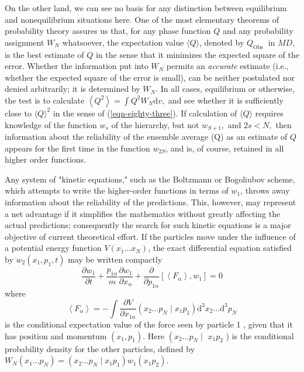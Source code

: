 \documentclass[]{article}
\begin{document}
On the other land, we can see no basis for any distinction between equilibrium and nonequilibrium situations here. One of the most elementary theorems of probability theory assures us that, for any phase function $Q$ and any probability assignment $W _{ N }$ whatsoever, the expectation value $\langle Q\rangle$, denoted by $Q_{\text {Obs }}$ in $M D$, is the best estimate of $Q$ in the sense that it minimizes the expected square of the error. Whether the information put into $W_{N}$ permits an \emph{accurate} estimate (i.e., whether the expected square of the error is small), can be neither postulated nor denied arbitrarily; it is determined by $W _{ N }$. In all cases, equilibrium or otherwise, the test is to calculate $\left\langle Q^{2}\right\rangle=\int Q^{2} W_{N}\text{d}v,$ and see whether it is sufficiently close to $\langle Q\rangle^{2}$ in the sense of (\ref{eqn-eighty-three}). If calculation of
$\langle Q \rangle$ requires knowledge of the function $w _{ s }$ of the hierarchy, but not $w _{ S +1},$ and $2 s < N ,$ then information about the reliability of the ensemble average (Q) as an estimate of $Q$ appears for the first time in the function $w _{2 S }$, and is, of course, retained in all higher order functions.

Any system of "kinetic equations," such as the Boltzmann or Bogoliubov scheme, which attempts to write the higher-order functions in terms of $w_{1}$, throws away information about the reliability of the predictions. This, however, may represent a net advantage if it simplifies the mathematics without greatly affecting the actual predictions; consequently the search for such kinetic equations is a major objective of current theoretical effort. If the particles move under the influence of a potential energy function $V\left( x _{1} \ldots x _{ N }\right)$, the exact differential equation satisfied by $w_{2}\left(x_{1}, p_{1}, t\right)$ may be written compactly
\begin{equation}
\frac{\partial w_{1}}{\partial t}+\frac{p_{1\alpha}}{m} \frac{\partial w_{1}}{\partial x_{\alpha}}+\frac{\partial}{\partial p_{1 \alpha}}\left[\left\langle F_{\alpha}\right\rangle, w_{1}\right]=0 \label{eqn-ninety-four}
\end{equation}
where
\begin{equation}
\left\langle F_{\alpha}\right\rangle=-\int \frac{\partial V}{\partial x_{1\alpha}}\left(x_{2} \ldots p_{N} \mid x_{1} p_{1}\right)\text{d}^{3} x_{2} \ldots\text{d}^{3} p_{N} \label{eqn-ninety-five}
\end{equation}
is the conditional expectation value of the force seen by particle 1 , given that it has position and momentum $\left(x_{1}, p_{1}\right)$. Here $\left(x_{2} \ldots p_{N} \mid\right.$ $x _{1} p _{2}$ ) is the conditional probability density for the other particles, defined by $W_{N}\left(x_{1} \ldots p_{N}\right)=\left(x_{2} \ldots p_{N} \mid x_{1} p_{1}\right) w_{1}\left(x_{1} p_{2}\right)$.
\end{document}
